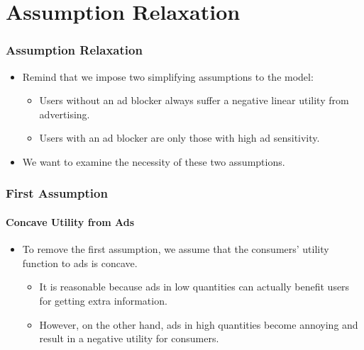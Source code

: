 \documentclass{beamer}
\newcommand{\hl}[1]{\textcolor{myblue}{#1}}
\begin{document}
\section{Assumption Relaxation}
\begin{frame}%
    \frametitle{Assumption Relaxation}
    \begin{itemize}
        \item Remind that we impose two simplifying assumptions to the model:
            \begin{itemize}
                \item Users without an ad blocker always suffer a negative linear
                    utility from advertising.
                \item Users with an ad blocker are only those with high ad sensitivity.
            \end{itemize}
        \item We want to examine the necessity of these two assumptions.
    \end{itemize}
\end{frame}

\begin{frame}%
    \frametitle{First Assumption}
    \framesubtitle{Concave Utility from Ads}
    \begin{itemize}
        \item To remove the first assumption, we assume that the consumers' utility function
            to ads is \hl{concave}.
            \begin{itemize}
                \item It is reasonable because ads in low quantities can actually benefit users
                    for getting extra information.
                \item However, on the other hand, ads in high quantities become annoying and
                    result in a negative utility for consumers.
            \end{itemize}
    \end{itemize}
\end{frame}
\end{document}
